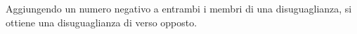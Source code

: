 Aggiungendo un numero negativo a entrambi i membri di una 
disuguaglianza, si ottiene una disuguaglianza di verso opposto.